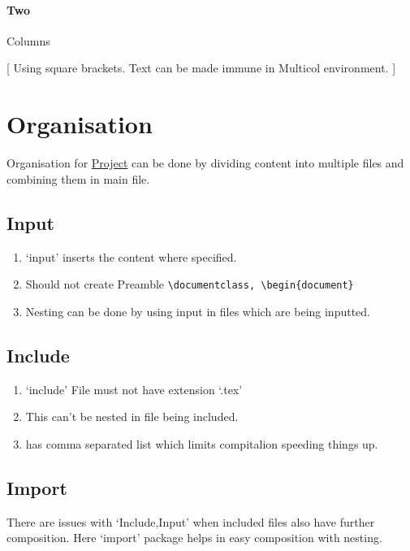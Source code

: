 \documentclass{report}[a4paper,12pt] %
\begin{document}
\paragraph{Two} Columns
\begin{multicols}{2}
  \setlength{\columnseprule}{1pt}
  \def\columnseprulecolor{\color{blue}}

  [
  Using square brackets. Text can be made immune in Multicol environment.
  ]
  \lipsum[2]
\end{multicols}

\section{Organisation}
Organisation for \href{https://www.overleaf.com/learn/latex/Management_in_a_large_project}{Project} can be done by dividing content into multiple files
and combining them in main file.

\subsection{Input}
\begin{enumerate}
  \item `input' inserts the content where specified.
  \item Should not create Preamble \verb|\documentclass, \begin{document}|
  \item Nesting can be done by using input in files which are being inputted.
\end{enumerate}

\subsection{Include}
\begin{enumerate}
  \item `include' File must not have extension `.tex'
  \item This can't be nested in file being included.
  \item \verb|| has comma separated list which limits compitalion speeding things up.
\end{enumerate}

\subsection{Import}
There are issues with `Include,Input' when included files also have further composition. Here `import' package helps in easy composition with nesting. 
\end{document}
